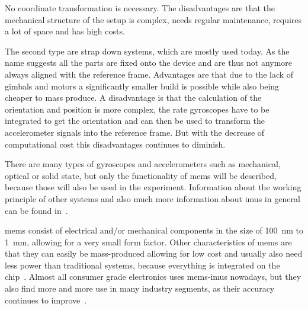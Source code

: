 No coordinate transformation is necessary.
The disadvantages are that the mechanical structure of the setup is complex, needs regular maintenance, requires a lot of space and has high costs.\par
The second type are strap down systems, which are mostly used today.
As the name suggests all the parts are fixed onto the device and are thus not anymore always aligned with the reference frame.
Advantages are that due to the lack of gimbals and motors a significantly smaller build is possible while also being cheaper to mass produce.
A disadvantage is that the calculation of the orientation and position is more complex, the rate gyroscopes have to be integrated to get the orientation and can then be used to transform the accelerometer signals into the reference frame.
But with the decrease of computational cost this disadvantages continues to diminish.\par
There are many types of gyroscopes and accelerometers such as mechanical, optical or solid state, but only the functionality of \gls{mems} will be described, because those will also be used in the experiment.
Information about the working principle of other systems and also much more information about \glspl{imu} in general can be found in~\cite{Woodman2007}.\par
\gls{mems} consist of electrical and/or mechanical components in the size of \SI{100}{\nano\metre} to \SI{1}{\milli\metre}, allowing for a very small form factor.
Other characteristics of \gls{mems} are that they can easily be mass-produced allowing for low cost and usually also need less power than traditional systems, because everything is integrated on the chip~\cite{Shaeffer2013}.
Almost all consumer grade electronics uses \gls{mems}-\glspl{imu} nowadays, but they also find more and more use in many industry segments, as their accuracy continues to improve~\cite{Perlmutter2016}.


